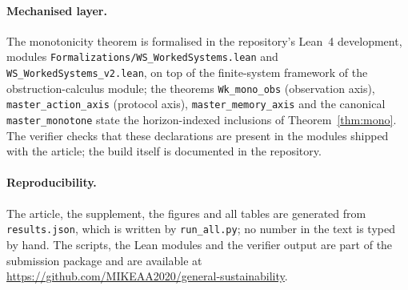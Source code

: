 \paragraph{Mechanised layer.}
The monotonicity theorem is formalised in the repository's Lean~4 development, modules \texttt{Formalizations/WS\_WorkedSystems.lean} and \texttt{WS\_WorkedSystems\_v2.lean}, on top of the finite-system framework of the obstruction-calculus module; the theorems \texttt{Wk\_mono\_obs} (observation axis), \texttt{master\_action\_axis} (protocol axis), \texttt{master\_memory\_axis} and the canonical \texttt{master\_monotone} state the horizon-indexed inclusions of Theorem~\ref{thm:mono}. The verifier checks that these declarations are present in the modules shipped with the article; the build itself is documented in the repository.

\paragraph{Reproducibility.}
The article, the supplement, the figures and all tables are generated from \texttt{results.json}, which is written by \texttt{run\_all.py}; no number in the text is typed by hand. The scripts, the Lean modules and the verifier output are part of the submission package and are available at \url{https://github.com/MIKEAA2020/general-sustainability}.
